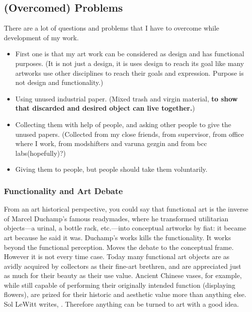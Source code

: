 \subsection{(Overcomed) Problems}
There are a lot of questions and problems that I have to overcome while development of my work. 


\begin{itemize}
\item First one is that my art work can be considered as design and has functional purposes. (It is not just a design, it is uses design to reach its goal like many artworks use other disciplines to reach their goals and expression. Purpose is not design and functionality.)
\item Using unused industrial paper. (Mixed trash and virgin material, \textbf{to show that discarded and desired object can live together.})
\item Collecting them with help of people, and asking other people to give the unused papers. (Collected from my close friends, from supervisor, from office where I work, from modshifters and varuna gezgin and from bcc labs(hopefully)?)
\item Giving them to people, but people should take them voluntarily.
\end{itemize}

%
\subsubsection{Functionality and Art Debate}
From an art historical perspective, you could say that functional art is the inverse of Marcel Duchamp's famous readymades, where he transformed utilitarian objects---a urinal, a bottle rack, etc.---into conceptual artworks by fiat: it became art because he said it was. Duchamp's works kills the functionality. It works beyond the functional perception. Moves the debate to the conceptual frame. However it is not every time case. Today many functional art objects are as avidly acquired by collectors as their fine-art brethren, and are appreciated just as much for their beauty as their use value. Ancient Chinese vases, for example, while still capable of performing their originally intended function (displaying flowers), are prized for their historic and aesthetic value more than anything else.  Sol LeWitt writes,  \cite{lewitt1967paragraphs}. Therefore anything can be turned to art with a good idea. 

